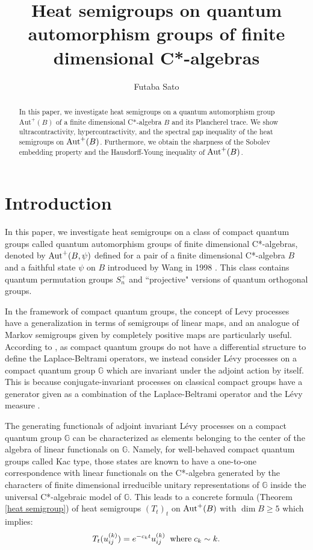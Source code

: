 \documentclass[12pt]{amsart}
\title{Heat semigroups on quantum automorphism groups of finite dimensional C*-algebras}
\author{Futaba Sato}
\theoremstyle{plain} %
\theoremstyle{definition}
\theoremstyle{remark}
\begin{document}
\maketitle

\begin{abstract}
In this paper, we investigate heat semigroups on a quantum automorphism group $\mathrm{Aut}^+(B)$ of a finite dimensional C*-algebra $B$ and its Plancherel trace. We show ultracontractivity, hypercontractivity, and the spectral gap inequality of the heat semigroups on ${\rm Aut}^+(B)$. Furthermore, we obtain the sharpness of the Sobolev embedding property and the Hausdorff-Young inequality of ${\rm Aut}^+(B)$.
\end{abstract}

\section{Introduction}
In this paper, we investigate heat semigroups on a class of compact quantum groups called quantum automorphism groups of finite dimensional C*-algebras, denoted by ${\rm Aut}^+(B,\psi)$ defined for a pair of a finite dimensional C*-algebra $B$ and a faithful state $\psi$ on $B$ introduced by Wang in 1998 \cite{Wan98}. 
This class contains quantum permutation groups $S_n^+$ and ``projective" versions of quantum orthogonal groups. 



In the framework of compact quantum groups, the concept of Levy processes have a generalization in terms of semigroups of linear maps, and an analogue of Markov semigroups given by completely positive maps are particularly useful. 
According to \cite{CFK}, as compact quantum groups do not have a differential structure to define the Laplace-Beltrami operators, we instead consider L\'evy processes on a compact quantum group $\mathbb{G}$ which are invariant under the adjoint action by itself. 
This is because conjugate-invariant processes on classical compact groups have a generator given as a combination of the Laplace-Beltrami operator and the L\'evy measure \cite{Lia04}.

The generating functionals of adjoint invariant L\'evy processes on a compact quantum group $\mathbb{G}$ can be characterized as elements belonging to the center of the algebra of linear functionals on $\mathbb{G}$. 
Namely, for well-behaved compact quantum groups called Kac type, those states are known to have a one-to-one correspondence with linear functionals on the C*-algebra generated by the characters of finite dimensional irreducible unitary representations of $\mathbb{G}$ inside the universal C*-algebraic model of $\mathbb{G}$.
This leads to a concrete formula (Theorem \ref{heat semigroup}) of heat semigroups $(T_t)_t$ on ${\rm Aut}^+(B)$ with $\dim B\geq 5$ \cite{BGJ2} which implies:
\[T_t(u_{ij}^{(k)})=e^{-c_kt}u_{ij}^{(k)} \;\;{\rm where}\;c_k\sim k.\]
\end{document}
